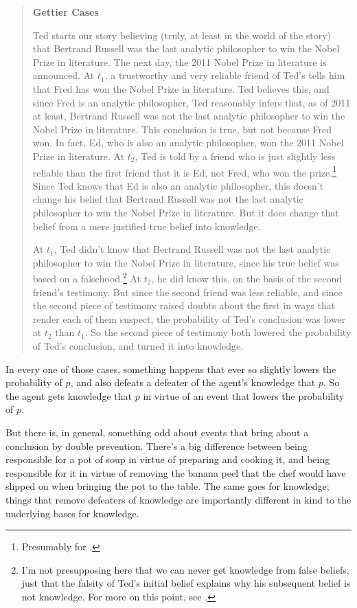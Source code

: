 \begin{quote}
\textbf{Gettier Cases}

Ted starts our story believing (truly, at least in the world of the story) that Bertrand Russell was the last analytic philosopher to win the Nobel Prize in literature. The next day, the 2011 Nobel Prize in literature is announced. At $t_1$, a trustworthy and very reliable friend of Ted's tells him that Fred has won the Nobel Prize in literature. Ted believes this, and since Fred is an analytic philosopher, Ted reasonably infers that, as of 2011 at least, Bertrand Russell was not the last analytic philosopher to win the Nobel Prize in literature. This conclusion is true, but not because Fred won. In fact, Ed, who is also an analytic philosopher, won the 2011 Nobel Prize in literature. At $t_2$, Ted is told by a friend who is just slightly less reliable than the first friend that it is Ed, not Fred, who won the prize.\footnote{Presumably for \citep{Gettier1963}.} Since Ted knows that Ed is also an analytic philosopher, this doesn't change his belief that Bertrand Russell was not the last analytic philosopher to win the Nobel Prize in literature. But it does change that belief from a mere justified true belief into knowledge. 

At $t_1$, Ted didn't know that Bertrand Russell was not the last analytic philosopher to win the Nobel Prize in literature, since his true belief was based on a falsehood.\footnote{I'm not presupposing here that we can never get knowledge from false beliefs, just that the falsity of Ted's initial belief explains why his subsequent belief is not knowledge. For more on this point, see \citet{Warfield2005}.} At $t_2$, he did know this, on the basis of the second friend's testimony. But since the second friend was less reliable, and since the second piece of testimony raised doubts about the first in ways that render each of them suspect, the probability of Ted's conclusion was lower at $t_2$ than $t_1$. So the second piece of testimony both lowered the probability of Ted's conclusion, and turned it into knowledge.
\end{quote}

\noindent In every one of those cases, something happens that ever so slightly lowers the probability of $p$, and also defeats a defeater of the agent's knowledge that $p$. So the agent gets knowledge that $p$ in virtue of an event that lowers the probability of $p$.

But there is, in general, something odd about events that bring about a conclusion by double prevention. There's a big difference between being responsible for a pot of soup in virtue of preparing and cooking it, and being responsible for it in virtue of removing the banana peel that the chef would have slipped on when bringing the pot to the table. The same goes for knowledge; things that remove defeaters of knowledge are importantly different in kind to the underlying bases for knowledge.

